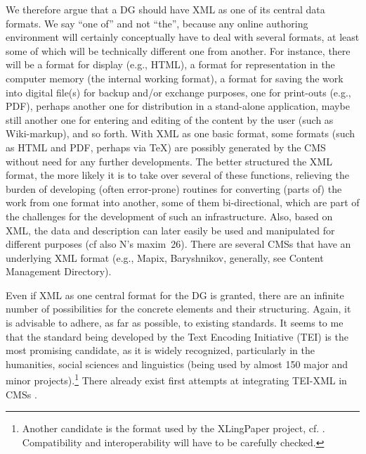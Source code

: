 We therefore argue that a DG should have XML as one of its central data formats. We say ``one of'' and not ``the'', because any online authoring environment will certainly conceptually have to deal with several formats, at least some of which will be technically different one from another. For instance, there will be a format for display (e.g., HTML), a format for representation in the computer memory (the internal working format), a format for saving the work into digital file(s) for backup and/or exchange purposes, one for print-outs (e.g., PDF), perhaps another one for distribution in a stand-alone application, maybe still another one for entering and editing of the content by the user (such as Wiki-markup), and so forth. With XML as one basic format, some formats (such as HTML and PDF, perhaps via TeX) are possibly generated by the CMS without need for any further developments. The better structured the XML format, the more likely it is to take over several of these functions, relieving the burden of developing (often error-prone) routines for converting (parts of) the work from one format into another, some of them bi-directional, which are part of the challenges for the development of such an infrastructure. Also, based on XML, the data and description can later easily be used and manipulated for different purposes (cf also N's maxim~26). There are several CMSs that have an underlying XML format (e.g., Mapix, Baryshnikov, generally, see Content Management Directory).

Even if XML as one central format for the DG is granted, there are an infinite number of possibilities for the concrete elements and their structuring. Again, it is advisable to adhere, as far as possible, to existing standards. It seems to me that the standard being developed by the Text Encoding Initiative (TEI) is the most promising candidate, as it is widely recognized, particularly in the humanities, social sciences and linguistics (being used by almost 150 major and minor projects).\footnote{Another 
 candidate is the format used by the XLingPaper project, cf. \citet{Black2009,Black2010,Blacktv,SimonsEtAl2009}. Compatibility and interoperability will have to be carefully checked.
} 
There already exist first attempts at integrating TEI-XML in CMSs \citep{Schlitz2010}.

